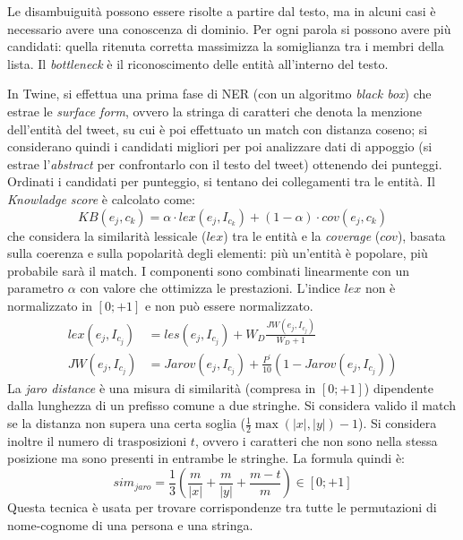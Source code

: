 \documentclass[11pt]{article}
\begin{document}
Le disambuiguità possono essere risolte a partire dal testo, ma in alcuni casi è necessario avere una conoscenza di dominio.
Per ogni parola si possono avere più candidati: quella ritenuta corretta massimizza la somiglianza tra i membri della lista.
Il \textit{bottleneck} è il riconoscimento delle entità all'interno del testo.

In Twine, si effettua una prima fase di NER (con un algoritmo \textit{black box}) che estrae le \textit{surface form}, ovvero la stringa di caratteri che denota la menzione dell'entità del tweet, su cui è poi effettuato un match con distanza coseno; si considerano quindi i candidati migliori per poi analizzare dati di appoggio (si estrae l'\textit{abstract} per confrontarlo con il testo del tweet) ottenendo dei punteggi.
Ordinati i candidati per punteggio, si tentano dei collegamenti tra le entità.
Il \textit{Knowladge score} è calcolato come:
\begin{equation*}
  KB(e_j, c_k) = \alpha \cdot lex(e_j, I_{c_k}) + (1 - \alpha) \cdot cov(e_j, c_k)
\end{equation*}
che considera la similarità lessicale ($lex$) tra le entità e la \textit{coverage} ($cov$), basata sulla coerenza e sulla popolarità degli elementi: più un'entità è popolare, più probabile sarà il match.
I componenti sono combinati linearmente con un parametro $\alpha$ con valore che ottimizza le prestazioni.
L'indice $lex$ non è normalizzato in $[0;+1]$ e non può essere normalizzato.
\begin{align*}
  lex(e_j, I_{c_j}) &= les(e_j, I_{c_j}) + W_D \frac{JW(e_j, I_{c_j})}{W_D + 1} \\
  JW(e_j, I_{c_j}) &= Jarov(e_j, I_{c_j}) + \frac{P^\prime}{10}(1 - Jarov(e_j, I_{c_j}))
\end{align*}
La \textit{jaro distance} è una misura di similarità (compresa in $[0; +1]$) dipendente dalla lunghezza di un prefisso comune a due stringhe.
Si considera valido il match se la distanza non supera una certa soglia ($\frac{1}{2}\max(|x|, |y|) - 1$).
Si considera inoltre il numero di trasposizioni $t$, ovvero i caratteri che non sono nella stessa posizione ma sono presenti in entrambe le stringhe.
La formula quindi è:
\begin{equation*}
  sim_{jaro} = \frac{1}{3}(\frac{m}{|x|} + \frac{m}{|y|} + \frac{m-t}{m}) \in [0; +1]
\end{equation*}
Questa tecnica è usata per trovare corrispondenze tra tutte le permutazioni di nome-cognome di una persona e una stringa.
\end{document}
